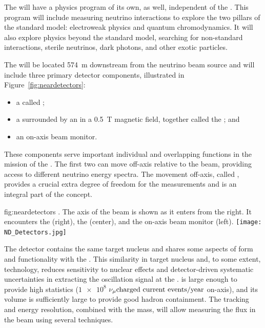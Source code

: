 The  will have a physics program of its own, as well, independent of the .  This program will include measuring neutrino interactions to explore the two pillars of the standard model: electroweak physics and quantum chromodynamics. It will also explore physics beyond the standard model, searching for non-standard interactions, sterile neutrinos,  dark photons, and  other exotic particles.

The  will be located \SI{574}{m} downstream from the neutrino beam source and will include three primary detector components, illustrated in Figure~\ref{fig:neardetectors}: 

\begin{itemize}
\item a  called ; 
\item a  surrounded by an  in a \SI{0.5}{T} magnetic field, together called the ; and 
\item an on-axis beam monitor. %
\end{itemize}
These components serve important individual and overlapping functions in the mission of the .  The first two can move off-axis relative to the beam, providing access to different neutrino energy spectra. The movement off-axis, called , provides a crucial extra degree of freedom for the  measurements and is an integral part of the   concept. 

\begin{dunefigure}
{fig:neardetectors}
{ . The axis of the beam is shown as it enters from the right. It encounters
the  (right), the  (center), and the on-axis beam monitor (left).}
\texttt{[image: ND\_Detectors.jpg]}
\end{dunefigure}

The  detector contains the same target nucleus and shares some aspects of form and functionality with the . 
This similarity in target nucleus and, to some extent, technology, reduces sensitivity to nuclear effects and detector-driven systematic uncertainties in extracting the oscillation signal at the  . %
 is large enough to provide high statistics ($\num{1e8}$ ${\nu_\mu \text{charged current events/year}}$ on-axis), and its volume is sufficiently large to provide good hadron containment.  The tracking and energy resolution, combined with the  mass, will allow measuring the flux in the beam using several techniques. %

